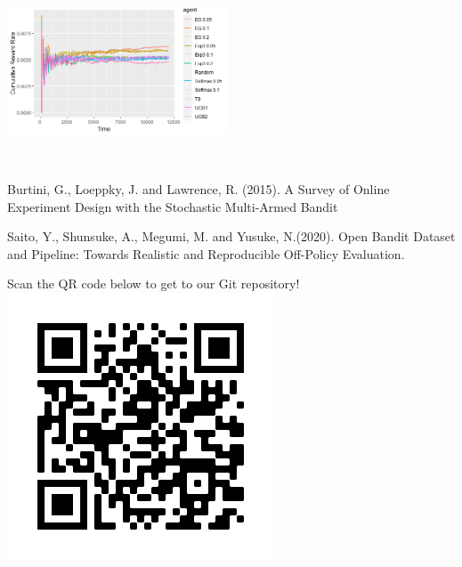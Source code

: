 \documentclass[a0,portrait]{a0poster}
\begin{document}
\begin{multicols}{2}

\begin{center}
    \includegraphics[width=0.49\textwidth]{./figures/RD-all.png}
    \label{fig:RD-best}
\end{center}



\end{multicols} 


\mbox{}\\[-1.5cm]
\begin{minipage}[c]{0.85\linewidth}

%
\begin{thebibliography}{}

Burtini, G., Loeppky, J. and Lawrence, R. (2015).
\newblock A Survey of Online Experiment Design with the Stochastic Multi-Armed Bandit

Saito, Y., Shunsuke, A., Megumi, M. and Yusuke, N.(2020).
\newblock	Open Bandit Dataset and Pipeline: Towards Realistic and Reproducible Off-Policy Evaluation.
\end{thebibliography}
\end{minipage}
\begin{minipage}[c]{0.13\linewidth}
\centering
Scan the QR code below to get to our Git repository!
\includegraphics[scale=0.9]{./figures/frame.png}
\end{minipage}
\end{document}
